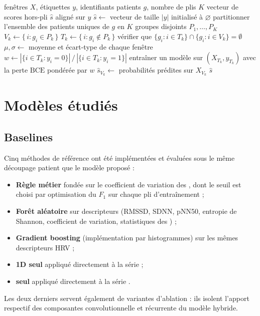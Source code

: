 \begin{algorithm}[H]
\caption{Validation croisée groupée par patient et calcul des scores hors-pli}
\label{alg:split}
\begin{algorithmic}[1]
\Require fenêtres \(X\), étiquettes \(y\), identifiants patients \(g\), nombre de plis \(K\)
\Ensure vecteur de scores hors-pli \(\hat{s}\) aligné sur \(y\)
\State \(\hat{s} \gets\) vecteur de taille \(|y|\) initialisé à \(\varnothing\)
\State partitionner l'ensemble des patients uniques de \(g\) en \(K\) groupes disjoints \(P_1, \dots, P_K\)
  \State \(V_k \gets \{\, i : g_i \in P_k \,\}\) 
  \State \(T_k \gets \{\, i : g_i \notin P_k \,\}\) 
  \State vérifier que \(\{g_i : i \in T_k\} \cap \{g_i : i \in V_k\} = \emptyset\)
  \State \(\mu, \sigma \gets\) moyenne et écart-type de chaque fenêtre 
  \State \(w \gets |\{i \in T_k : y_i = 0\}| \,/\, |\{i \in T_k : y_i = 1\}|\) 
  \State entraîner un modèle sur \((X_{T_k}, y_{T_k})\) avec la perte \(\mathrm{BCE}\) pondérée par \(w\)
  \State \(\hat{s}_{V_k} \gets\) probabilités prédites sur \(X_{V_k}\)
\EndFor
\State \Return \(\hat{s}\)
\end{algorithmic}
\end{algorithm}

\section{Modèles étudiés}
\label{sec:meth:modeles}

\subsection{Baselines}
Cinq méthodes de référence ont été implémentées et évaluées sous le même découpage patient que le modèle proposé :
\begin{itemize}
  \item \textbf{Règle métier} fondée sur le coefficient de variation des \RR{}, dont le seuil est choisi par optimisation du \(F_1\) sur chaque pli d'entraînement ;
  \item \textbf{Forêt aléatoire} sur descripteurs  (RMSSD, SDNN, pNN50, entropie de Shannon, coefficient de variation, statistiques des \RR{}) ;
  \item \textbf{Gradient boosting} (implémentation par histogrammes) sur les mêmes descripteurs HRV ;
  \item \textbf{\CNN{} 1D seul} appliqué directement à la série \RR{} ;
  \item \textbf{\LSTM{} seul} appliqué directement à la série \RR{}.
\end{itemize}
Les deux derniers servent également de variantes d'ablation : ils isolent l'apport respectif des composantes convolutionnelle et récurrente du modèle hybride.

